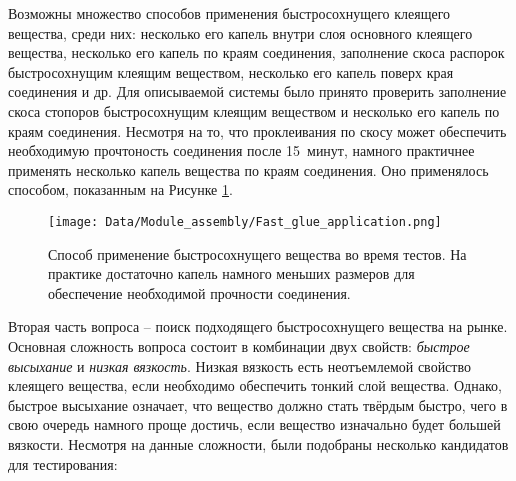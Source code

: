 Возможны множество способов применения быстросохнущего клеящего вещества, среди них: несколько его капель внутри слоя основного клеящего вещества, несколько его капель по краям соединения, заполнение скоса распорок быстросохнущим клеящим веществом, несколько его капель поверх края соединения и др. Для описываемой системы было принято проверить заполнение скоса стопоров быстросохнущим клеящим веществом и несколько его капель по краям соединения. Несмотря на то, что проклеивания по скосу может обеспечить необходимую прочтоность соединения после 15~минут, намного практичнее применять несколько капель вещества по краям соединения. Оно применялось способом, показанным на Рисунке \ref{fig:glue_application}.

\begin{figure}[ht]\centering
\texttt{[image: Data/Module\_assembly/Fast\_glue\_application.png]}
\caption{Способ применение быстросохнущего вещества во время тестов. На практике достаточно капель намного меньших размеров для обеспечение необходимой прочности соединения.}
\label{fig:glue_application}
\end{figure}

Вторая часть вопроса -- поиск подходящего быстросохнущего вещества на рынке. Основная сложность вопроса состоит в комбинации двух свойств: \emph{быстрое высыхание} и \emph{низкая вязкость}. Низкая вязкость есть неотъемлемой свойство клеящего вещества, если необходимо обеспечить тонкий слой вещества. Однако, быстрое высыхание означает, что вещество должно стать твёрдым быстро, чего в свою очередь намного проще достичь, если вещество изначально будет большей вязкости. Несмотря на данные сложности, были подобраны несколько кандидатов для тестирования:

